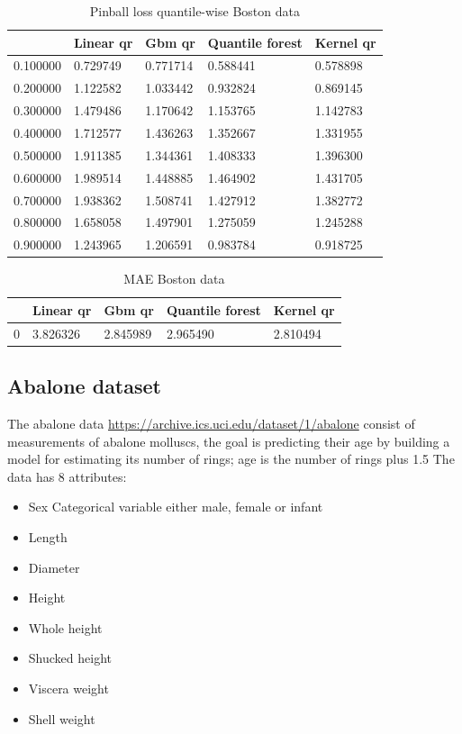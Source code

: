 \begin{table}
    \caption{Pinball loss quantile-wise Boston data}
\begin{tabular}{lllll}
\toprule
    & Linear qr & Gbm qr & Quantile forest & Kernel qr \\
\midrule
0.100000 & 0.729749 & 0.771714 & 0.588441 & 0.578898 \\
0.200000 & 1.122582 & 1.033442 & 0.932824 & 0.869145 \\
0.300000 & 1.479486 & 1.170642 & 1.153765 & 1.142783 \\
0.400000 & 1.712577 & 1.436263 & 1.352667 & 1.331955 \\
0.500000 & 1.911385 & 1.344361 & 1.408333 & 1.396300 \\
0.600000 & 1.989514 & 1.448885 & 1.464902 & 1.431705 \\
0.700000 & 1.938362 & 1.508741 & 1.427912 & 1.382772 \\
0.800000 & 1.658058 & 1.497901 & 1.275059 & 1.245288 \\
0.900000 & 1.243965 & 1.206591 & 0.983784 & 0.918725 \\
\bottomrule
\end{tabular}
\end{table}
        
\begin{table}
\caption{MAE Boston data}    
\begin{tabular}{lllll}
\toprule
    & Linear qr & Gbm qr & Quantile forest & Kernel qr \\
\midrule
0 & 3.826326 & 2.845989 & 2.965490 & 2.810494 \\
\bottomrule
\end{tabular}

\end{table}

\subsection{Abalone dataset}
The abalone data \href{https://archive.ics.uci.edu/dataset/1/abalone}{https://archive.ics.uci.edu/dataset/1/abalone} consist of measurements of abalone molluscs, the goal is predicting their age by building a model for estimating its number of rings; age is the number of rings plus 1.5
The data has 8 attributes:
\begin{itemize}
    \item Sex Categorical variable either male, female or infant
    \item Length
    \item Diameter
    \item Height
    \item Whole height
    \item Shucked height
    \item Viscera weight
    \item Shell weight
\end{itemize}

